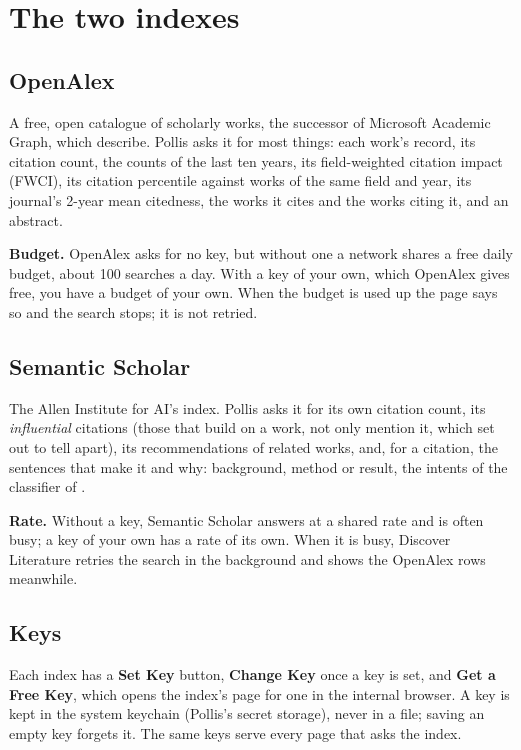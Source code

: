 \section{The two indexes}\label{sec:indexes}

\subsection{OpenAlex}
A free, open catalogue of scholarly works, the successor of Microsoft Academic Graph, which
 describe. Pollis asks it for most things:
each work's record, its citation count, the counts of the last ten years, its field-weighted citation impact (FWCI), its
citation percentile against works of the same field and year, its journal's 2-year mean citedness, the works it cites
and the works citing it, and an abstract.

\textbf{Budget.} OpenAlex asks for no key, but without one a network shares a free daily budget, about 100 searches a
day. With a key of your own, which OpenAlex gives free, you have a budget of your own. When the budget is used up the
page says so and the search stops; it is not retried.

\subsection{Semantic Scholar}
The Allen Institute for AI's index. Pollis asks it for its own citation count, its \emph{influential} citations (those
that build on a work, not only mention it, which  set out to tell
apart), its recommendations of related works, and, for a citation, the sentences
that make it and why: background, method or result, the intents of the classifier of .

\textbf{Rate.} Without a key, Semantic Scholar answers at a shared rate and is often busy; a key of your own has a rate of
its own. When it is busy, Discover Literature retries the search in the background and shows the OpenAlex rows meanwhile.

\subsection{Keys}
Each index has a \textbf{Set Key} button, \textbf{Change Key} once a key is set, and \textbf{Get a Free Key}, which opens
the index's page for one in the internal browser. A key is kept in the system keychain (Pollis's secret storage), never in
a file; saving an empty key forgets it. The same keys serve every page that asks the index.

